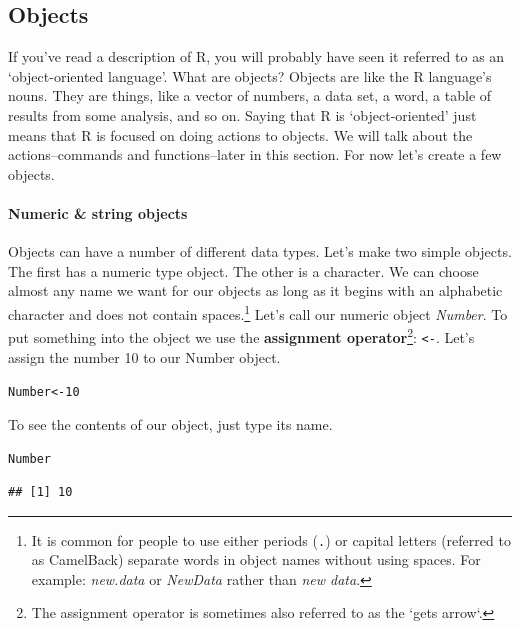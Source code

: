 \subsection{Objects}\label{Objects}

If you've read a description of R, you will probably have seen it referred to as an `object-oriented language'.  What are objects? Objects are like the R language's nouns. They are things, like a vector of numbers, a data set, a word, a table of results from some analysis, and so on. Saying that R is `object-oriented' just means that R is focused on doing actions to objects. We will talk about the actions--commands and functions--later in this section. For now let's create a few objects.

\paragraph{Numeric \& string objects}

Objects can have a number of different data types. Let's make two simple objects. The first has a numeric type object. The other is a character. We can choose almost any name we want for our objects as long as it begins with an alphabetic character and does not contain spaces.\footnote{It is common for people to use either periods (\texttt{.}) or capital letters (referred to as CamelBack) separate words in object names without using spaces. For example: {\emph{new.data}} or {\emph{NewData}} rather than {\emph{new data}}.} Let's call our numeric object {\emph{Number}}. To put something into the object we use the {\bf{assignment operator}}\footnote{The assignment operator is sometimes also referred to as the `gets arrow`.}: {\tt{\textless -}}. Let's assign the number 10 to our Number object.

\begin{knitrout}
\color{fgcolor}\begin{kframe}
\begin{alltt}
Number <- 10
\end{alltt}
\end{kframe}
\end{knitrout}


\noindent To see the contents of our object, just type its name.

\begin{knitrout}
\color{fgcolor}\begin{kframe}
\begin{alltt}
Number
\end{alltt}
\begin{verbatim}
## [1] 10
\end{verbatim}
\end{kframe}
\end{knitrout}


